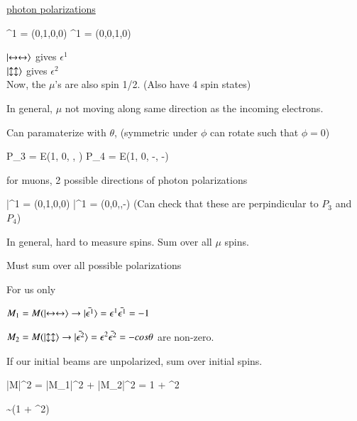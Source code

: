 {\underline{photon polarizations} 

\be
\epsilon^1 = (0,1,0,0) \hspace*{1in} \epsilon^1 = (0,0,1,0)
\ee


$\ket{\leftrightarrow \leftrightarrow}$ gives $\epsilon^1$\\
$\ket{\updownarrow \updownarrow}$ gives $\epsilon^2$\\

Now, the $\mu$'s are also spin 1/2.  (Also have 4 spin states)

In general, $\mu$ not moving along same direction as the incoming electrons. 

Can paramaterize with $\theta$, (symmetric under $\phi$ can rotate such that $\phi = 0$)

\be
P_3 = E(1, 0, \sin\theta, \cos\theta ) \hspace*{1in}  P_4 = E(1, 0, -\sin\theta, -\cos\theta )
\ee

for muons, 2 possible directions of photon polarizations

\be
\bar{\epsilon}^1 = (0,1,0,0)  \hspace*{1in} \bar{\epsilon}^1 = (0,0,\cos\theta,-\sin\theta)
\ee
(Can check that these are perpindicular to $P_3$ and $P_4$)

In general,  hard to measure spins. Sum over all $\mu$ spins.

Must sum over all possible  polarizations


For us only 
\bi
\item[-]$M_1 = M(\ket{\leftrightarrow \leftrightarrow} \rightarrow \ket{\bar{\epsilon^1}} = \epsilon^1 \bar{\epsilon^1} = -1$ 
\item[-]$M_2 = M(\ket{\updownarrow \updownarrow} \rightarrow \ket{\bar{\epsilon^2}} = \epsilon^2 \bar{\epsilon^2} = -cos\theta$ 
\ei
are non-zero.

If our initial beams are unpolarized, sum over initial spins. 

\be
|M|^2 = |M_1|^2 + |M_2|^2 = 1 + \cos^2\theta
\ee


\be
{} \sim {}(1 + \cos^2\theta)
\ee


}


